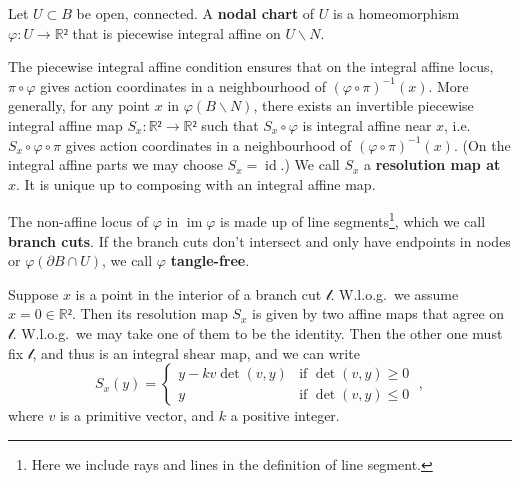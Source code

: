 \documentclass[12pt,a4paper,abstract=true,draft]{scrartcl}
\DeclareMathOperator{\id}{id}
\DeclareMathOperator{\im}{im}
\begin{document}
\begin{definition}
  Let $U ⊂ B$ be open, connected.
  A \textbf{nodal chart} of $U$ is a homeomorphism $φ \colon U → ℝ²$ that is piecewise integral affine on $U ∖ N$.
\end{definition}

The piecewise integral affine condition ensures that on the integral affine locus, $π ∘ φ$ gives action coordinates in a neighbourhood of $(φ ∘ π)^{-1}(x)$.
More generally, for any point $x$ in $φ(B ∖ N)$, there exists an invertible piecewise integral affine map $S_x\colon ℝ² → ℝ²$ such that $S_x ∘ φ$ is integral affine near $x$, i.e. $S_x ∘ φ ∘ π$ gives action coordinates in a neighbourhood of $(φ ∘ π)^{-1}(x)$. (On the integral affine parts we may choose $S_x = \id$.)
We call $S_x$ a \textbf{resolution map at $x$}.
It is unique up to composing with an integral affine map.

The non-affine locus of $φ$ in $\im φ$ is made up of line segments\footnote{Here we include rays and lines in the definition of line segment.}, which we call \textbf{branch cuts}.
If the branch cuts don't intersect and only have endpoints in nodes or $φ(∂B ∩ U)$, we call $φ$ \textbf{tangle-free}.

\begin{remark}
  \label{rem:bc_resolution}
  Suppose $x$ is a point in the interior of a branch cut $𝓁$. W.l.o.g.\ we assume $x = 0 ∈ ℝ²$.
Then its resolution map $S_x$ is given by two affine maps that agree on $𝓁$.
W.l.o.g.\ we may take one of them to be the identity.
Then the other one must fix $𝓁$, and thus is an integral shear map, and we can write
\[
  S_x(y) = \begin{cases}
    y - k v\det(v,y) & \text{if } \det(v,y) ≥ 0 \\
    y & \text{if } \det(v,y) ≤ 0
  \end{cases} \; ,
\]
where $v$ is a primitive vector, and $k$ a positive integer.
\end{remark}
\end{document}
